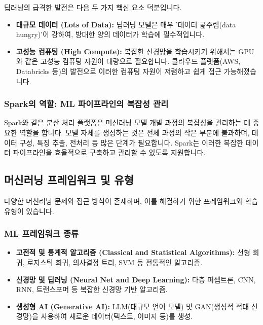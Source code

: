 \documentclass[11pt,a4paper]{article}
\begin{document}
\begin{tcolorbox}[summarybox={딥러닝의 발전 요인}]
딥러닝의 급격한 발전은 다음 두 가지 핵심 요소 덕분입니다.
\begin{itemize}
    \item \textbf{대규모 데이터 (Lots of Data):} 딥러닝 모델은 매우 '데이터 굶주림(data hungry)'이 강하여, 방대한 양의 데이터가 학습에 필수적입니다.
    \item \textbf{고성능 컴퓨팅 (High Compute):} 복잡한 신경망을 학습시키기 위해서는 GPU와 같은 고성능 컴퓨팅 자원이 대량으로 필요합니다. 클라우드 플랫폼(AWS, Databricks 등)의 발전으로 이러한 컴퓨팅 자원이 저렴하고 쉽게 접근 가능해졌습니다.
\end{itemize}
\end{tcolorbox}

\subsubsection*{Spark의 역할: ML 파이프라인의 복잡성 관리}
Spark와 같은 분산 처리 플랫폼은 머신러닝 모델 개발 과정의 복잡성을 관리하는 데 중요한 역할을 합니다. 모델 자체를 생성하는 것은 전체 과정의 작은 부분에 불과하며, 데이터 구성, 특징 추출, 전처리 등 많은 단계가 필요합니다. Spark는 이러한 복잡한 데이터 파이프라인을 효율적으로 구축하고 관리할 수 있도록 지원합니다.

\subsection*{머신러닝 프레임워크 및 유형}
다양한 머신러닝 문제와 접근 방식이 존재하며, 이를 해결하기 위한 프레임워크와 학습 유형이 있습니다.

\subsubsection*{ML 프레임워크 종류}
\begin{itemize}
    \item \textbf{고전적 및 통계적 알고리즘 (Classical and Statistical Algorithms):} 선형 회귀, 로지스틱 회귀, 의사결정 트리, SVM 등 전통적인 알고리즘.
    \item \textbf{신경망 및 딥러닝 (Neural Net and Deep Learning):} 다층 퍼셉트론, CNN, RNN, 트랜스포머 등 복잡한 신경망 기반 알고리즘.
    \item \textbf{생성형 AI (Generative AI):} LLM(대규모 언어 모델) 및 GAN(생성적 적대 신경망)을 사용하여 새로운 데이터(텍스트, 이미지 등)를 생성.
\end{itemize}
\end{document}
